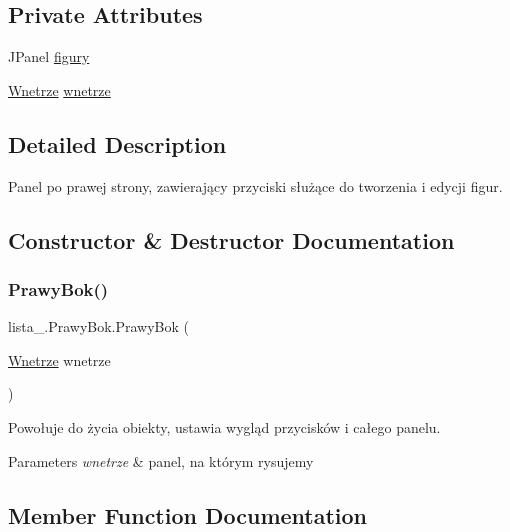 \subsection*{Private Attributes}
\begin{DoxyCompactItemize}
\item 
J\+Panel \mbox{\hyperlink{classlista__5_1_1_prawy_bok_a5835844758db5e5e2e7ab2abcde758a9}{figury}}
\item 
\mbox{\hyperlink{classlista__5_1_1_wnetrze}{Wnetrze}} \mbox{\hyperlink{classlista__5_1_1_prawy_bok_a78d3ca2516dbab20a29c94c57b83c071}{wnetrze}}
\end{DoxyCompactItemize}


\subsection{Detailed Description}
Panel po prawej strony, zawierający przyciski służące do tworzenia i edycji figur. 

\subsection{Constructor \& Destructor Documentation}
\mbox{\label{classlista__5_1_1_prawy_bok_af7872920a7b9440729c7321e98b62de3}} 
\subsubsection{\texorpdfstring{Prawy\+Bok()}{PrawyBok()}}
{\footnotesize\ttfamily lista\+\_.\+Prawy\+Bok.\+Prawy\+Bok (\begin{DoxyParamCaption}\item[{\mbox{\hyperlink{classlista__5_1_1_wnetrze}{Wnetrze}}}]{wnetrze }\end{DoxyParamCaption})}

Powołuje do życia obiekty, ustawia wygląd przycisków i całego panelu. 
\begin{DoxyParams}{Parameters}
{\em wnetrze} & panel, na którym rysujemy \\
\hline
\end{DoxyParams}


\subsection{Member Function Documentation}
\mbox{\label{classlista__5_1_1_prawy_bok_a8966b8a4e49226ba2116a33c07f3060b}} 
